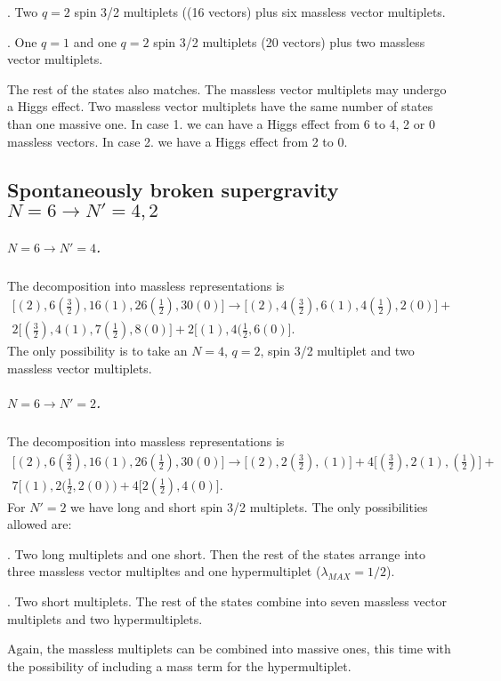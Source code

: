 \documentclass[a4paper,12pt]{article}
\begin{document}
. Two $q=2$ spin 3/2 multiplets ((16 vectors) plus six massless vector multiplets.


. One $q=1$ and one $q=2$ spin 3/2 multiplets (20 vectors) plus two massless vector multiplets.

The rest of the states also matches. The massless vector
multiplets may undergo  a Higgs effect. Two massless vector
multiplets have the same number of states than one massive one. In
case 1. we  can have a Higgs effect from 6 to 4, 2 or 0 massless
vectors. In case 2.  we have a Higgs effect from 2 to 0.

\subsection{Spontaneously broken  supergravity  $N=6\rightarrow N'=4,2$\label{6to42}}

\subparagraph{$N=6\rightarrow N'=4$.}The decomposition into massless representations is
\begin{eqnarray*}\bigl[ (2), 6(\frac{3}{2}), 16(1), 26(\frac{1}{2}), 30(0)\bigr]\rightarrow
\bigl[ (2), 4(\frac{3}{2}), 6(1),4(\frac{1}{2}), 2(0)\bigr]+\\
2\bigl[ (\frac{3}{2}), 4(1), 7(\frac{1}{2}), 8(0)\bigr]+2\bigl[
(1), 4(\frac{1}{2}, 6(0)\bigr].\end{eqnarray*} The only
possibility is to take an $N=4$, $q=2$, spin 3/2 multiplet and two
massless vector multiplets.

\subparagraph{$N=6\rightarrow N'=2$.}The decomposition into massless representations is
\begin{eqnarray*}\bigl[ (2), 6(\frac{3}{2}), 16(1), 26(\frac{1}{2}), 30(0)\bigr]\rightarrow
\bigl[ (2), 2(\frac{3}{2}), (1)\bigr]+ 4\bigl[ (\frac{3}{2}),
2(1), (\frac{1}{2})\bigr]+\\7\bigl[ (1), 2(\frac{1}{2},
2(0)\bigr)+ 4\bigl[ 2(\frac{1}{2}), 4(0)\bigr].\end{eqnarray*} For
$N'=2$ we have long and short spin 3/2 multiplets. The only
possibilities allowed are:

. Two long multiplets and one short. Then the rest of
the states arrange into three massless  vector multipltes and one
hypermultiplet ($\lambda_{MAX}= 1/2$).

. Two short multiplets. The rest of the states combine into seven
massless vector multiplets and two hypermultiplets.

Again, the massless multiplets can be combined into massive ones,
this time with the possibility of   including a mass term for the
hypermultiplet.
\end{document}
